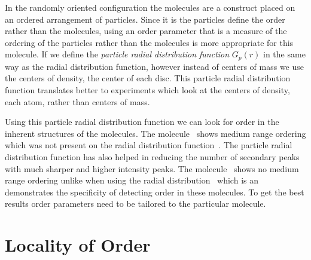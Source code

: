 In the randomly oriented configuration the molecules are a construct placed on an ordered arrangement of particles. Since it is the particles define the order rather than the molecules, using an order parameter that is a measure of the ordering of the particles rather than the molecules is more appropriate for this molecule. If we define the \emph{particle radial distribution function} $G_p(r)$ in the same way as the radial distribution function, however instead of centers of mass we use the centers of density, the center of each disc. This particle radial distribution function translates better to experiments which look at the centers of density, each atom, rather than centers of mass. 



Using this particle radial distribution function we can look for order in the inherent structures of the molecules. The \dcon molecule~ shows medium range ordering which was not present on the radial distribution function~. The particle radial distribution function has also helped in reducing the number of secondary peaks with much sharper and higher intensity peaks. The \done molecule~ shows no medium range ordering unlike when using the radial distribution~ which is an demonstrates the specificity of detecting order in these molecules. To get the best results order parameters need to be tailored to the particular molecule.


\section{Locality of Order}


